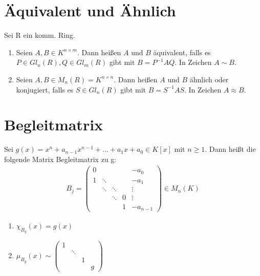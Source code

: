 \section{Äquivalent und Ähnlich}
\begin{definition}
Sei R ein komm. Ring.
\begin{enumerate}
	\item Seien $A,B \in K^{n \times m}$. Dann heißen $A$ und $B$ äquivalent, falls es $P \in Gl_n(R), Q \in Gl_m(R)$ gibt mit $B=P^{-1}AQ$. In Zeichen $A \sim B$.
	\item Seien $A,B \in M_n(R) = K^{n \times n}$. Dann heißen $A$ und $B$ ähnlich oder konjugiert, falls es $S \in Gl_n(R)$ gibt mit $B=S^{-1}AS$. In Zeichen $A \approx B$.
\end{enumerate}
\end{definition}

\section{Begleitmatrix}
\begin{definition}
Sei $g(x) = x^n + a_{n-1}x^{n-1}+\ldots+a_1x + a_0 \in K[x]$ mit $n \geq 1$. Dann heißt die folgende Matrix Begleitmatrix zu g:
\begin{align*}
B_j =
\begin{pmatrix}
0 &        &		&  & -a_0 \\
1 & \ddots &		&  & -a_1 \\
  & \ddots & \ddots	&  & \vdots \\
  &        & \ddots	& 0 & \vdots \\
  &        &		& 1 & -a_{n-1}
\end{pmatrix}
\in M_n(K)
\end{align*} 
\end{definition}
\begin{remark}
\leavevmode
\begin{enumerate}
	\item $\chi_{B_g}(x) = g(x)$
	\item $\mu_{B_g}(x) \sim 
	\begin{pmatrix}
		1 &        & & \\
		  & \ddots & & \\
		  &        &1& \\
		  &        & & g
	\end{pmatrix}$
\end{enumerate}
\end{remark}
